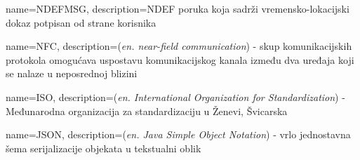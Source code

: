 {name={NDEFMSG}, description={NDEF poruka koja sadrži vremensko-lokacijski dokaz potpisan od strane korisnika}}

{name={NFC}, description={(\textit{en. near-field communication}) - skup komunikacijskih protokola omogućava uspostavu komunikacijskog kanala između dva uređaja koji se nalaze u neposrednoj blizini}}

{name={ISO}, description={(\textit{en. International Organization for Standardization}) - Međunarodna organizacija za standardizaciju u Ženevi, Švicarska}}

{name={JSON}, description={(\textit{en. Java Simple Object Notation}) - vrlo jednostavna šema serijalizacije objekata u tekstualni oblik}}
